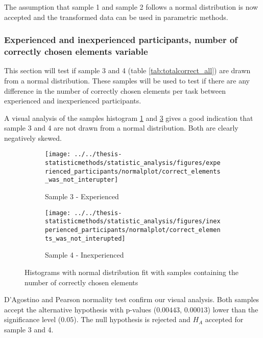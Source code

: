 The assumption that sample 1 and sample 2 follows a normal distribution is now accepted and the transformed data can be used in parametric methods.

\subsubsection[Sample 3 and 4]{Experienced and inexperienced participants, number of correctly chosen elements variable}\label{sec:correct_ex_inex}
This section will test if sample 3 and 4 (table \ref{tab:totalcorrect_all}) are drawn from a normal distribution. These samples will be used to test if there are any difference in the number of correctly chosen elements per task between experienced and inexperienced participants. 

A visual analysis of the samples histogram \ref{fig:correctelementswasnotinterupter_ex} and \ref{fig:correctelementswasnotinterupted_inex} gives a good indication that sample 3 and 4 are not drawn from a normal distribution. Both are clearly negatively skewed. 

\begin{figure}[h!]
	\centering
	\begin{subfigure}[b]{0.48\textwidth}
		\centering
		\texttt{[image: ../../thesis-statisticmethods/statistic\_analysis/figures/experienced\_participants/normalplot/correct\_elements\_was\_not\_interupter]}
		\caption{Sample 3 - Experienced}
		\label{fig:correctelementswasnotinterupter_ex}
	\end{subfigure}
	\begin{subfigure}[b]{0.48\textwidth}
		\centering
		\texttt{[image: ../../thesis-statisticmethods/statistic\_analysis/figures/inexperienced\_participants/normalplot/correct\_elements\_was\_not\_interupted]}
		\caption{Sample 4 - Inexperienced}
		\label{fig:correctelementswasnotinterupted_inex}
	\end{subfigure}
	\caption{Histograms with normal distribution fit with samples containing the number of correctly chosen elements}
\end{figure}

D'Agostino and Pearson normality test confirm our visual analysis. Both samples accept the alternative hypothesis with p-values ($0.00443$, $0.00013$) lower than the significance level ($0.05$). The null hypothesis is rejected and $H_A$ accepted for sample 3 and 4.

